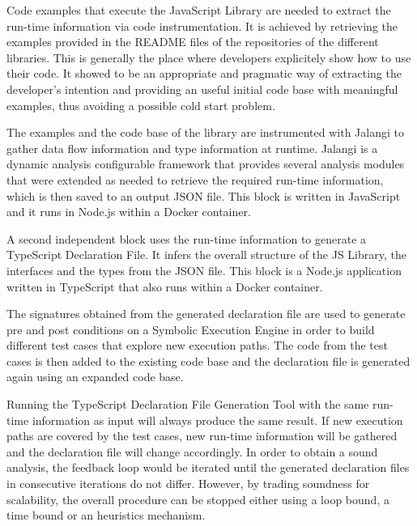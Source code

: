 Code examples that execute the JavaScript Library are needed to extract the run-time information via code instrumentation. It is achieved by retrieving the examples provided in the README files of the repositories of the different libraries. This is generally the place where developers explicitely show how to use their code. It showed to be an appropriate and pragmatic way of extracting the developer's intention and providing an useful initial code base with meaningful examples, thus avoiding a possible cold start problem. 

The examples and the code base of the library are instrumented with Jalangi \citep{DBLP:conf/sigsoft/SenKBG13}\citep{DBLP:conf/sigsoft/SenKBG13a} to gather data flow information and type information at runtime. Jalangi is a dynamic analysis configurable framework that provides several analysis modules that were extended as needed to retrieve the required run-time information, which is then saved to an output JSON file. This block is written in JavaScript and it runs in Node.js within a Docker container.

A second independent block uses the run-time information to generate a TypeScript Declaration File. It infers the overall structure of the JS Library, the interfaces and the types from the JSON file. This block is a Node.js application written in TypeScript that also runs within a Docker container.

The signatures obtained from the generated declaration file are used to generate pre and post conditions on a Symbolic Execution Engine in order to build different test cases that explore new execution paths. The code from the test cases is then added to the existing code base and the declaration file is generated again using an expanded code base.

Running the TypeScript Declaration File Generation Tool with the same run-time information as input will always produce the same result. If new execution paths are covered by the test cases, new run-time information will be gathered and the declaration file will change accordingly. In order to obtain a sound analysis, the feedback loop would be iterated until the generated declaration files in consecutive iterations do not differ. However, by trading soundness for scalability, the overall procedure can be stopped either using a loop bound, a time bound or an heuristics mechanism.  


